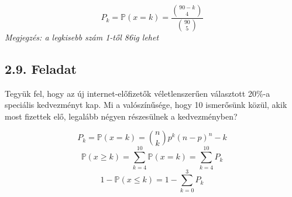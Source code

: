 \documentclass{article}
\begin{document}
\[ P_k =  \mathbb{P}(x=k) = \frac{\binom{90-k}{4}}{\binom{90}{5}}\]
\textit{Megjegzés: a legkisebb szám 1-től 86ig lehet}


\subsection{2.9. Feladat}
Tegyük fel, hogy az új internet-előfizetők véletlenszerűen választott 20\%-a speciális kedvezményt kap. Mi a
valószínűsége, hogy 10 ismerősünk közül, akik most fizettek elő, legalább négyen részesülnek a kedvezményben?

\[ P_k = \mathbb{P}(x=k) = \binom{n}{k} p^k (n-p)^n-k \]
\[ \mathbb{P}(x \geq k) = \sum_{k=4}^{10} {\mathbb{P}(x=k)} =\sum_{k=4}^{10} {P_k}  \]
\[ 1 - \mathbb{P}(x \leq k) = 1 - \sum_{k=0}^{3} {P_k}  \]
\end{document}
